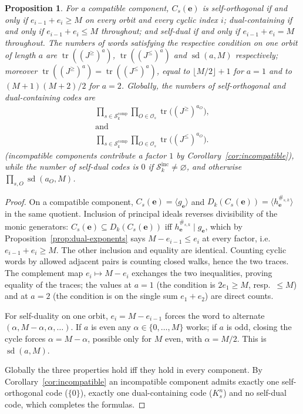 \documentclass[preprint,12pt,a4paper]{elsarticle}
\newcommand{\Os}{\mathcal O_s}
\newcommand{\Dk}{D_k}
\newtheorem{proposition}[theorem]{Proposition}
\theoremstyle{definition}
\theoremstyle{remark}
\begin{document}
\begin{proposition}\label{prop:extremal-counts}
For a compatible component, $C_s(\mathbf{e})$ is self-orthogonal if and only
if $e_{i-1}+e_i\geq M$ on \emph{every} orbit and every cyclic index $i$;
dual-containing if and only if $e_{i-1}+e_i\leq M$ throughout; and self-dual
if and only if $e_{i-1}+e_i=M$ throughout.  The numbers of words satisfying
the respective condition on one orbit of length $a$ are
$\operatorname{tr}((J^{\geq})^a)$, $\operatorname{tr}((J^{\leq})^a)$ and
$\operatorname{sd}(a,M)$ respectively; moreover
$\operatorname{tr}((J^{\geq})^a)=\operatorname{tr}((J^{\leq})^a)$, equal to
$\lfloor M/2\rfloor+1$ for $a=1$ and to $(M+1)(M+2)/2$ for $a=2$.
Globally, the numbers of self-orthogonal and dual-containing codes are
\[
\begin{gathered}
\prod_{s\in\mathcal{S}_k^{\mathrm{comp}}}
\prod_{O\in\Os}
\operatorname{tr}\bigl((J^{\geq})^{a_O}\bigr),
\\[5pt]
\text{and}\\[5pt]
\prod_{s\in\mathcal{S}_k^{\mathrm{comp}}}
\prod_{O\in\Os}
\operatorname{tr}\bigl((J^{\leq})^{a_O}\bigr).
\end{gathered}
\]
(incompatible components contribute a factor $1$ by
Corollary~\ref{cor:incompatible}), while the number of self-dual codes is $0$ if
$\mathcal{S}_k^{\mathrm{inc}}\neq\varnothing$, and otherwise
$\prod_{s,O}\operatorname{sd}(a_O,M)$.
\end{proposition}

\begin{proof}
On a compatible component, $C_s(\mathbf{e})=\langle g_{\mathbf{e}}\rangle$ and
$\Dk(C_s(\mathbf{e}))=\langle h_{\mathbf{e}}^{\#_{s,k}}\rangle$ in the same
quotient.  Inclusion of principal ideals reverses divisibility of the monic
generators: $C_s(\mathbf{e})\subseteq\Dk(C_s(\mathbf{e}))$ iff
$h_{\mathbf{e}}^{\#_{s,k}}\mid g_{\mathbf{e}}$, which by
Proposition~\ref{prop:dual-exponents} says $M-e_{i-1}\leq e_i$ at every factor,
i.e.\ $e_{i-1}+e_i\geq M$.  The other inclusion and equality are identical.
Counting cyclic words by allowed adjacent pairs is counting closed walks,
hence the two traces.  The complement map $e_i\mapsto M-e_i$ exchanges the two
inequalities, proving equality of the traces; the values at $a=1$ (the
condition is $2e_1\geq M$, resp.\ $\leq M$) and at $a=2$ (the condition is on
the single sum $e_1+e_2$) are direct counts.

For self-duality on one orbit, $e_i=M-e_{i-1}$ forces the word to alternate
$(\alpha,M-\alpha,\alpha,\ldots)$.  If $a$ is even any
$\alpha\in\{0,\ldots,M\}$ works; if $a$ is odd, closing the cycle forces
$\alpha=M-\alpha$, possible only for $M$ even, with $\alpha=M/2$.  This is
$\operatorname{sd}(a,M)$.

Globally the three properties hold iff they hold in every component.  By
Corollary~\ref{cor:incompatible} an incompatible component admits exactly one
self-orthogonal code ($\{0\}$), exactly one dual-containing code ($K_s^n$) and
no self-dual code, which completes the formulas.
\end{proof}
\end{document}

